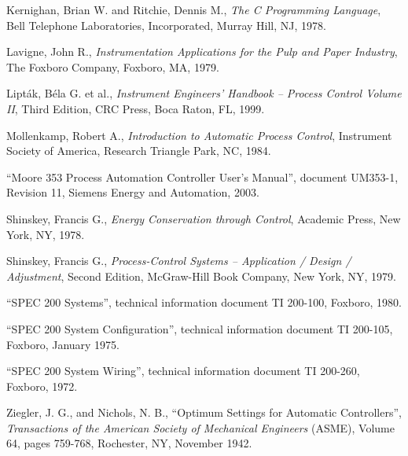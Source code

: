 \vskip 10pt

\noindent
Kernighan, Brian W. and Ritchie, Dennis M., \textit{The C Programming Language}, Bell Telephone Laboratories, Incorporated, Murray Hill, NJ, 1978.

\vskip 10pt

\noindent
Lavigne, John R., \textit{Instrumentation Applications for the Pulp and Paper Industry}, The Foxboro Company, Foxboro, MA, 1979.

\vskip 10pt

\noindent
Lipt\'ak, B\'ela G. et al., \textit{Instrument Engineers' Handbook -- Process Control Volume II}, Third Edition, CRC Press, Boca Raton, FL, 1999.

\vskip 10pt

\noindent
Mollenkamp, Robert A., \textit{Introduction to Automatic Process Control}, Instrument Society of America, Research Triangle Park, NC, 1984. 

\vskip 10pt

\noindent
``Moore 353 Process Automation Controller User's Manual'', document UM353-1, Revision 11, Siemens Energy and Automation, 2003.

\vskip 10pt

\noindent
Shinskey, Francis G., \textit{Energy Conservation through Control}, Academic Press, New York, NY, 1978. 

\vskip 10pt

\noindent
Shinskey, Francis G., \textit{Process-Control Systems -- Application / Design / Adjustment}, Second Edition, McGraw-Hill Book Company, New York, NY, 1979. 

\vskip 10pt

\noindent
``SPEC 200 Systems'', technical information document TI 200-100, Foxboro, 1980.

\vskip 10pt

\noindent
``SPEC 200 System Configuration'', technical information document TI 200-105, Foxboro, January 1975.

\vskip 10pt

\noindent
``SPEC 200 System Wiring'', technical information document TI 200-260, Foxboro, 1972.

\vskip 10pt

\noindent
Ziegler, J. G., and Nichols, N. B., ``Optimum Settings for Automatic Controllers'', \textit{Transactions of the American Society of Mechanical Engineers} (ASME), Volume 64, pages 759-768, Rochester, NY, November 1942.












